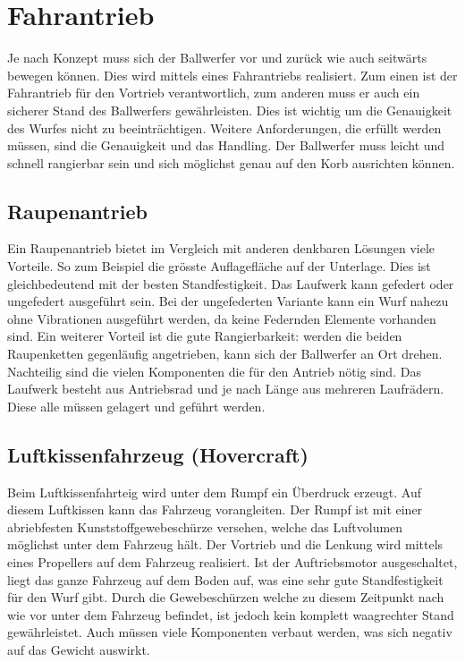 ﻿\section{Fahrantrieb}
Je nach Konzept muss sich der Ballwerfer vor und zurück wie auch seitwärts bewegen können. Dies wird mittels eines Fahrantriebs realisiert. Zum einen ist der Fahrantrieb für den Vortrieb verantwortlich, zum anderen muss er auch ein sicherer Stand des Ballwerfers gewährleisten. Dies ist wichtig um die Genauigkeit des Wurfes nicht zu beeinträchtigen. Weitere Anforderungen, die erfüllt werden müssen, sind die Genauigkeit und das Handling. Der Ballwerfer muss leicht und schnell rangierbar sein und sich möglichst genau auf den Korb ausrichten können. 

\subsection{Raupenantrieb}
Ein Raupenantrieb bietet im Vergleich mit anderen denkbaren Lösungen viele Vorteile. So zum Beispiel die grösste Auflagefläche auf der Unterlage. Dies ist gleichbedeutend mit der besten Standfestigkeit. Das Laufwerk kann gefedert oder ungefedert ausgeführt sein. Bei der ungefederten Variante kann ein Wurf nahezu ohne Vibrationen ausgeführt werden, da keine Federnden Elemente vorhanden sind. Ein weiterer Vorteil ist die gute Rangierbarkeit: werden die beiden Raupenketten gegenläufig angetrieben, kann sich der Ballwerfer an Ort drehen. Nachteilig sind die vielen Komponenten die für den Antrieb nötig sind. Das Laufwerk besteht aus Antriebsrad und je nach Länge aus mehreren Laufrädern. Diese alle müssen gelagert und geführt werden. 
 
\subsection{Luftkissenfahrzeug (Hovercraft)}
Beim Luftkissenfahrteig wird unter dem Rumpf ein Überdruck erzeugt. Auf diesem Luftkissen kann das Fahrzeug vorangleiten. Der Rumpf ist mit einer abriebfesten Kunststoffgewebeschürze versehen, welche das Luftvolumen möglichst unter dem Fahrzeug hält. Der Vortrieb und die Lenkung wird mittels eines Propellers auf dem Fahrzeug realisiert. Ist der Auftriebsmotor ausgeschaltet, liegt das ganze Fahrzeug auf dem Boden auf, was eine sehr gute Standfestigkeit für den Wurf gibt. Durch die Gewebeschürzen welche zu diesem Zeitpunkt nach wie vor unter dem Fahrzeug befindet, ist jedoch kein komplett waagrechter Stand gewährleistet. Auch müssen viele Komponenten verbaut werden, was sich negativ auf das Gewicht auswirkt.

